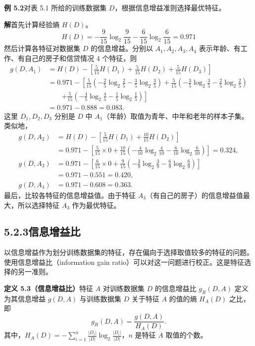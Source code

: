 \documentclass[UTF8,12pt,a4paper,fontset=fandol]{ctexart}
\begin{document}
\noindent\textbf{例 5.2}\quad 对表 5.1 所给的训练数据集 $D$，根据信息增益准则选择最优特征。

\noindent\textbf{解}\quad 首先计算经验熵 $H(D)$。
\[
  H(D)=-\frac{9}{15}\log_2\frac{9}{15}-\frac{6}{15}\log_2\frac{6}{15}=0.971
\]
然后计算各特征对数据集 $D$ 的信息增益。分别以 $A_1,A_2,A_3,A_4$ 表示年龄、有工作、有自己的房子和信贷情况 4 个特征，则
\[
\begin{aligned}
  g(D,A_1)
  &=H(D)-\left[\frac{5}{15}H(D_1)+\frac{5}{15}H(D_2)+\frac{5}{15}H(D_3)\right] \\
  &=0.971-\left[\frac{5}{15}\left(-\frac25\log_2\frac25-\frac35\log_2\frac35\right)
  +\frac{5}{15}\left(-\frac35\log_2\frac35-\frac25\log_2\frac25\right)\right.\\
  &\qquad\left.
  +\frac{5}{15}\left(-\frac45\log_2\frac45-\frac15\log_2\frac15\right)\right] \\
  &=0.971-0.888=0.083 .
\end{aligned}
\]
这里 $D_1,D_2,D_3$ 分别是 $D$ 中 $A_1$（年龄）取值为青年、中年和老年的样本子集。类似地，
\[
\begin{aligned}
  g(D,A_2)
  &=H(D)-\left[\frac{5}{15}H(D_1)+\frac{10}{15}H(D_2)\right] \\
  &=0.971-\left[\frac{5}{15}\times0+\frac{10}{15}\left(-\frac{4}{10}\log_2\frac{4}{10}-\frac{6}{10}\log_2\frac{6}{10}\right)\right]=0.324,\\
  g(D,A_3)
  &=0.971-\left[\frac{6}{15}\times0+\frac{9}{15}\left(-\frac39\log_2\frac39-\frac69\log_2\frac69\right)\right] \\
  &=0.971-0.551=0.420,\\
  g(D,A_4)&=0.971-0.608=0.363 .
\end{aligned}
\]
最后，比较各特征的信息增益值。由于特征 $A_3$（有自己的房子）的信息增益值最大，所以选择特征 $A_3$ 作为最优特征。

\subsection*{5.2.3\quad 信息增益比}

以信息增益作为划分训练数据集的特征，存在偏向于选择取值较多的特征的问题。使用信息增益比（information gain ratio）可以对这一问题进行校正。这是特征选择的另一准则。

\noindent\textbf{定义 5.3（信息增益比）}\quad 特征 $A$ 对训练数据集 $D$ 的信息增益比 $g_R(D,A)$ 定义为其信息增益 $g(D,A)$ 与训练数据集 $D$ 关于特征 $A$ 的值的熵 $H_A(D)$ 之比，即
\begin{equation}
  g_R(D,A)=\frac{g(D,A)}{H_A(D)}.
  \tag{5.10}
\end{equation}
其中，$H_A(D)=-\sum_{i=1}^{n}\frac{|D_i|}{|D|}\log_2\frac{|D_i|}{|D|}$，$n$ 是特征 $A$ 取值的个数。
\end{document}
